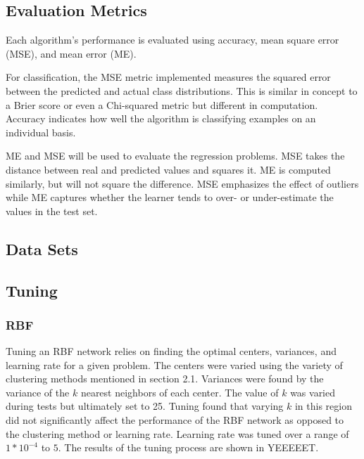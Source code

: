 \documentclass[twoside,11pt]{article}
\begin{document}
\subsection{Evaluation Metrics}
Each algorithm's performance is evaluated using accuracy, mean square error (MSE), and mean error (ME).

For classification, the MSE metric implemented measures the squared error between the predicted and actual class distributions. This is similar in concept to a Brier score or even a Chi-squared metric but different in computation.  Accuracy indicates how well the algorithm is classifying examples on an individual basis.

ME and MSE will be used to evaluate the regression problems. MSE takes the distance between real and predicted values and squares it. ME is computed similarly, but will not square the difference. MSE emphasizes the effect of outliers while ME captures whether the learner tends to over- or under-estimate the values in the test set.
\subsection{Data Sets}
\subsection{Tuning}
\subsubsection{RBF}
Tuning an RBF network relies on finding the optimal centers, variances, and learning rate for a given problem. The centers were varied using the variety of clustering methods mentioned in section 2.1. Variances were found by the variance of the $k$ nearest neighbors of each center. The value of $k$ was varied during tests but ultimately set to 25. Tuning found that varying $k$ in this region did not significantly affect the performance of the RBF network as opposed to the clustering method or learning rate. Learning rate was tuned over a range of $1*10^{-4}$ to $5$. The results of the tuning process are shown in YEEEEET. %
\end{document}
